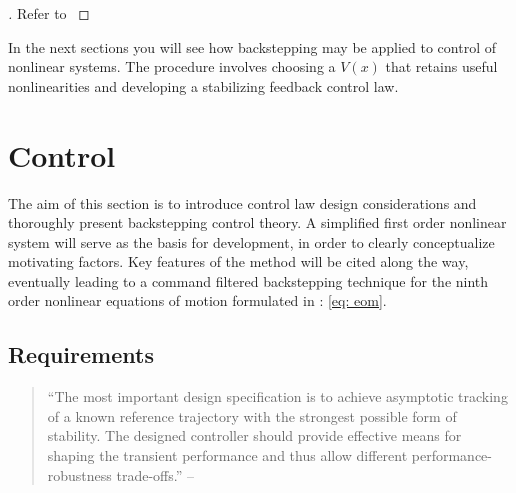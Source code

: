 \documentclass[12pt]{ucthesis}
\begin{document}
\begin{proof}[]
	Refer to \citet[Sec. 4.5.2, Pg. 124]{Slotine1991}
\end{proof}

In the next sections you will see how backstepping may be applied to control of nonlinear systems. The procedure involves choosing a $V(x)$ that retains useful nonlinearities and developing a stabilizing feedback control law.

\section{Control}
\label{sec: control}

The aim of this section is to introduce control law design considerations and thoroughly present backstepping control theory. A simplified first order nonlinear system will serve as the basis for development, in order to clearly conceptualize motivating factors. Key features of the method will be cited along the way, eventually leading to a command filtered backstepping technique for the ninth order nonlinear equations of motion formulated in : \autoref{eq: eom}.

\subsection{Requirements}
\label{subsec: requirements}

\begin{quotation}
\noindent ``The most important design specification is to achieve asymptotic tracking of a known reference trajectory with the strongest possible form of stability. The designed controller should provide effective means for shaping the transient performance and thus allow different performance-robustness trade-offs.''
\flushright --\citet{Krstic95}
\end{quotation}
\end{document}
